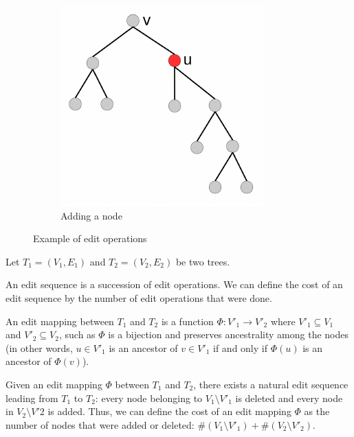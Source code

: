 \begin{figure}[h]
\begin{subfigure}[b]{0.3\textwidth}
    \centering
    \includegraphics[width=\textwidth]{figures/edit_addition.pdf}
    \caption{Adding a node}
    \label{fig:addition}
  \end{subfigure}
  \caption{Example of edit operations}\label{fig:edit}
\end{figure}

Let $T_{1} = (V_{1},E_{1})$ and $T_{2} = (V_{2},E_{2})$ be two
trees. 

An edit sequence is a succession of edit operations. We can define the
cost of an edit sequence by the number of edit operations that were done.

An edit mapping between $T_{1}$ and $T_{2}$ is
a function $\Phi : V'_{1} \rightarrow V'_{2}$ where
$V'_{1} \subseteq V_{1}$ and $V'_{2} \subseteq V_{2}$, such as $\Phi$
is a bijection and preserves ancestrality among the nodes (in other
words, $u \in V'_{1}$ is an ancestor of  $v \in V'_{1}$ if and only if
$\Phi(u)$ is an ancestor of $\Phi(v)$). 

Given an edit mapping $\Phi$ between $T_{1}$ and $T_{2}$, there exists
a natural edit sequence leading from $T_{1}$ to $T_{2}$: every node
belonging to $V_{1} \setminus V'_{1}$ is deleted and every node in
$V_{2} \setminus V'{2}$ is added. Thus, we can define the cost of an
edit mapping $\Phi$ as the number of nodes that were added or deleted:
${\#(V_{1} \setminus V'_{1}) + \#(V_{2} \setminus V'_{2})}$.

